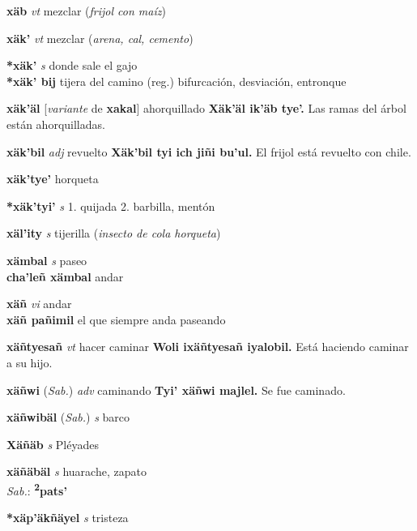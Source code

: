 \documentclass[10pt]{scrbook}
\newcommand{\entry}[1]{\textbf{#1}}
\newcommand{\onedefinition}[1]{#1.}
\newcommand{\partofspeech}[1]{\textit{#1}}
\newcommand{\spanishtranslation}[1]{#1}
\newcommand{\clarification}[1]{(\textit{#1})}
\newcommand{\cholexample}[1]{\textbf{#1}}
\newcommand{\exampletranslation}[1]{#1}
\newcommand{\dialectvariant}[1]{\\\textit{#1}:}
\newcommand{\dialectword}[1]{\textbf{#1}}
\newcommand{\relevantdialect}[1]{(\textit{#1})}
\newcommand{\secondaryentry}[1]{\\\textbf{#1}}
\newcommand{\secondtranslation}[1]{#1}
\newcommand{\conjugationtense}[1]{[\textit{#1}}
\newcommand{\conjugationverb}[1]{de \textbf{#1}]}
\begin{document}
\begin{multicols}{2}
\entry{xäb}
\partofspeech{vt}
\spanishtranslation{mezclar}
\clarification{frijol con maíz}

\entry{xäk'}
\partofspeech{vt}
\spanishtranslation{mezclar}
\clarification{arena, cal, cemento}

\entry{*xäk'}
\partofspeech{s}
\spanishtranslation{donde sale el gajo}
\secondaryentry{*xäk' bij}
\secondtranslation{tijera del camino (reg.)}
\secondtranslation{bifurcación, desviación, entronque}

\entry{xäk'äl}
\conjugationtense{variante}
\conjugationverb{xakal}
\spanishtranslation{ahorquillado}
\cholexample{Xäk'äl ik'äb tye'.}
\exampletranslation{Las ramas del árbol están ahorquilladas.}

\entry{xäk'bil}
\partofspeech{adj}
\spanishtranslation{revuelto}
\cholexample{Xäk'bil tyi ich jiñi bu'ul.}
\exampletranslation{El frijol está revuelto con chile.}

\entry{xäk'tye'}
\spanishtranslation{horqueta}

\entry{*xäk'tyi'}
\partofspeech{s}
\onedefinition{1}
\spanishtranslation{quijada}
\onedefinition{2}
\spanishtranslation{barbilla, mentón}

\entry{xäl'ity}
\partofspeech{s}
\spanishtranslation{tijerilla}
\clarification{insecto de cola horqueta}

\entry{xämbal}
\partofspeech{s}
\spanishtranslation{paseo}
\secondaryentry{cha'leñ xämbal}
\secondtranslation{andar}

\entry{xäñ}
\partofspeech{vi}
\spanishtranslation{andar}
\secondaryentry{xäñ pañimil}
\secondtranslation{el que siempre anda paseando}

\entry{xäñtyesañ}
\partofspeech{vt}
\spanishtranslation{hacer caminar}
\cholexample{Woli ixäñtyesañ iyalobil.}
\exampletranslation{Está haciendo caminar a su hijo.}

\entry{xäñwi}
\relevantdialect{Sab.}
\partofspeech{adv}
\spanishtranslation{caminando}
\cholexample{Tyi' xäñwi majlel.}
\exampletranslation{Se fue caminado.}

\entry{xäñwibäl}
\relevantdialect{Sab.}
\partofspeech{s}
\spanishtranslation{barco}

\entry{Xäñäb}
\partofspeech{s}
\spanishtranslation{Pléyades}

\entry{xäñäbäl}
\partofspeech{s}
\spanishtranslation{huarache, zapato}
\dialectvariant{Sab.}
\dialectword{\textsuperscript{2}pats'}

\entry{*xäp'äkñäyel}
\partofspeech{s}
\spanishtranslation{tristeza}


\end{multicols}
\end{document}
